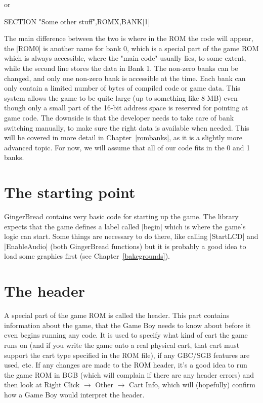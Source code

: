 \documentclass[11pt]{book}
\begin{document}
or 

\begin{code}
SECTION "Some other stuff",ROMX,BANK[1]
\end{code}

The main difference between the two is where in the ROM the code will appear, the |ROM0| is another name for bank 0, which is a special part of the game ROM which is always accessible, where the "main code" usually lies, to some extent, while the second line stores the data in Bank 1. The non-zero banks can be changed, and only one non-zero bank is accessible at the time. Each bank can only contain a limited number of bytes of compiled code or game data. This system allows the game to be quite large (up to something like 8 MB) even though only a small part of the 16-bit address space is reserved for pointing at game code. The downside is that the developer needs to take care of bank switching manually, to make sure the right data is available when needed. This will be covered in more detail in Chapter~\ref{rombanks}, as it is a slightly more advanced topic. For now, we will assume that all of our code fits in the 0 and 1 banks.

\section{The starting point}
\label{begin}
GingerBread contains very basic code for starting up the game. The library expects that the game defines a label called |begin| which is where the game's logic can start. Some things are necessary to do there, like calling |StartLCD| and |EnableAudio| (both GingerBread functions) but it is probably a good idea to load some graphics first (see Chapter~\ref{bakcgrounds}).

\section{The header}
\label{header}
A special part of the game ROM is called the header. This part contains information about the game, that the Game Boy needs to know about before it even begins running any code. It is used to specify what kind of cart the game runs on (and if you write the game onto a real physical cart, that cart must support the cart type specified in the ROM file), if any GBC/SGB features are used, etc. If any changes are made to the ROM header, it’s a good idea to run the game ROM in BGB (which will complain if there are any header errors) and then look at Right Click $\rightarrow$ Other $\rightarrow$ Cart Info, which will (hopefully) confirm how a Game Boy would interpret the header. 
\end{document}
